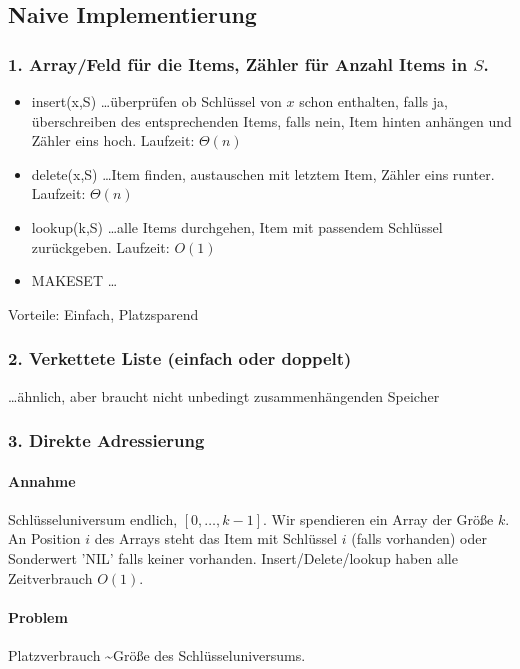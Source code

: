 \subsection{Naive Implementierung}

\subsubsection*{1. Array/Feld für die Items, Zähler für Anzahl Items in $S$.}
\begin{itemize}
	\item[] insert(x,S) \dots überprüfen ob Schlüssel von $x$ schon enthalten, falls ja, überschreiben des entsprechenden Items, falls nein, Item hinten anhängen und Zähler eins hoch. Laufzeit: $\Theta(n)$
	\item[]  delete(x,S) \dots Item finden, austauschen mit letztem Item, Zähler eins runter. Laufzeit: $\Theta(n)$
	\item[] lookup(k,S) \dots alle Items durchgehen, Item mit passendem Schlüssel zurückgeben. Laufzeit: $O(1)$
	\item[] MAKESET \dots
\end{itemize}
Vorteile: Einfach, Platzsparend

\subsubsection*{2. Verkettete Liste (einfach oder doppelt)}
 \dots ähnlich, aber braucht nicht unbedingt zusammenhängenden Speicher
 
\subsubsection*{3. Direkte Adressierung}
\paragraph*{Annahme} Schlüsseluniversum endlich, $[0,\dots,k-1]$. Wir spendieren ein Array der Größe $k$. An Position $i$ des Arrays steht das Item mit Schlüssel $i$ (falls vorhanden) oder Sonderwert 'NIL' falls keiner vorhanden. Insert/Delete/lookup haben alle Zeitverbrauch $O(1)$.

\paragraph*{Problem} Platzverbrauch \textasciitilde Größe des Schlüsseluniversums.

